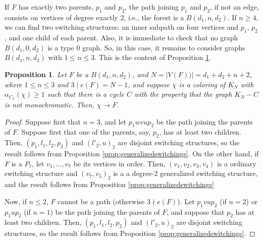 \documentclass[11pt]{article}
\newtheorem{proposition}[theorem]{Proposition}
\begin{document}
 If $F$ has exactly two parents, $p_1$ and $p_2$, the path joining $p_1$ and $p_2$, if not an edge, consists on vertices of degree exactly $2$, i.e., the forest is a $B(d_1,n,d_2)$. If $n \geq 4$, we can find two switching structures: an inner subpath on four vertices and $p_1$, $p_2$, and one child of each parent. Also, it is immediate to check that no graph $B(d_1,0,d_2)$ is a type $0$ graph. So, in this case, it remains to consider graphs $B(d_1,n,d_2)$ with $1 \leq n \leq 3$. This is the content of Proposition \ref{prop:bgraphs}.
 
\begin{proposition}\label{prop:bgraphs}
    Let $F$ be a $B(d_1,n,d_2)$, and $N=|V(F))|=d_1+d_2+n+2$, where $1 \leq n \leq 3$ and $3 \mid e(F)=N-1$, and suppose $\chi$ is a coloring of $K_{N}$ with $\alpha_{C_4}(\chi) \geq 1$ such that there is a cycle $C$ with the property that the graph $K_{N}-C$ is not monochromatic. Then, $\chi \rightarrow F$.
\end{proposition}

\begin{proof}
    Suppose first that $n=3$, and let $p_1wvup_2$ be the path joining the parents of $F$. Suppose first that one of the parents, say, $p_2$, has at least two children. Then, $(p_1,l_1,l_2,p_2)$ and $(l'_2,u)_2$ are disjoint switching structures, so the result follows from Proposition \ref{prop:generalizedswitchings}. On the other hand, if $F$ is a $P_7$, let $v_1, \dots, v_7$ be its vertices in order. Then, $(v_1,v_2,v_3,v_4)$ is a ordinary switching structure and $(v_7,v_5)_2$ is a a degree-2 generalized switching structure, and the result follows from Proposition \ref{prop:generalizedswitchings}
    


    \medskip
    
    Now, if $n \leq 2$, $F$ cannot be a path (otherwise $3 \nmid e(F)$). Let $p_1vup_2$ (if $n=2$) or $p_1up_2$ (if $n=1$) be the path joining the parents of $F$, and suppose that $p_2$ has at least two children. Then, $(p_1,l_1,l_2,p_2)$ and $(l'_2,u)_2$ are disjoint switching structures, so the result follows from Proposition \ref{prop:generalizedswitchings}.
    
\end{proof}
\end{document}
